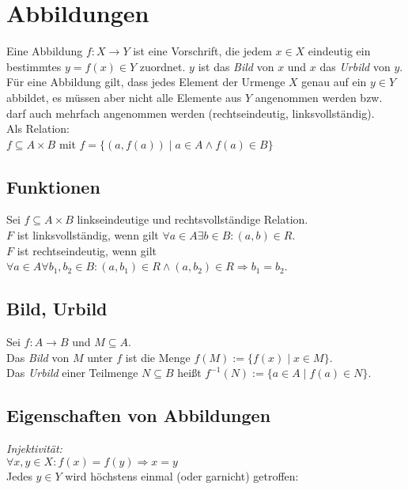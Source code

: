 \section{Abbildungen}
Eine Abbildung $f:X\to Y$ ist eine Vorschrift, die jedem $x\in X$ eindeutig ein bestimmtes
$y=f(x)\in Y$ zuordnet. $y$ ist das \emph{Bild} von $x$ und $x$ das \emph{Urbild} von $y$.
Für eine Abbildung gilt, dass jedes Element der Urmenge $X$ genau auf ein $y\in Y$ abbildet, es müssen aber nicht alle Elemente aus $Y$ angenommen werden bzw. darf auch mehrfach angenommen werden (rechtseindeutig, linksvollständig).\\
Als Relation:\\
$f\subseteq A\times B$ mit $f=\{(a,f(a))\mid a\in A\wedge f(a)\in B\}$
\subsection*{Funktionen}
Sei $f\subseteq A\times B$ linkseindeutige und rechtsvollständige Relation.\\
$F$ ist linksvollständig, wenn gilt $\forall a\in A\exists b\in B:(a,b)\in R$.\\
$F$ ist rechtseindeutig, wenn gilt $\forall a\in A\forall b_1,b_2\in B:(a,b_1)\in R\wedge
(a,b_2)\in R\Rightarrow b_1=b_2$.
\subsection*{Bild, Urbild}
Sei $f:A\to B$ und $M\subseteq A$.\\
Das \emph{Bild} von $M$ unter $f$ ist die Menge $f(M):=\{f(x)\mid x\in M\}$.\\
Das \emph{Urbild} einer Teilmenge $N\subseteq B$ heißt $f^{-1}(N):=\{a\in A\mid f(a)\in N\}$.
\subsection*{Eigenschaften von Abbildungen}
\emph{Injektivität:}\\
$\forall x,y\in X: f(x)=f(y)\Rightarrow x=y$\\
Jedes $y\in Y$ wird höchstens einmal (oder garnicht) getroffen:


